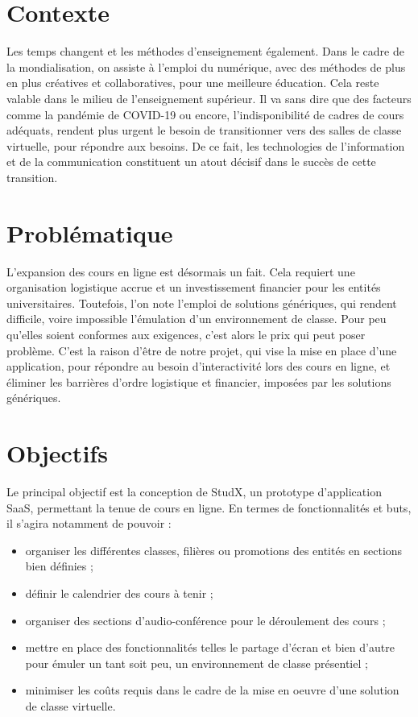 
\introduction

\thispagestyle{plain} %

\section*{Contexte}
Les temps changent et les méthodes d’enseignement également. 
Dans le cadre de la mondialisation, on assiste à l'emploi du numérique, 
avec des méthodes de plus en plus créatives et collaboratives, 
pour une meilleure éducation. Cela reste valable dans le milieu de l’enseignement supérieur.
Il va sans dire que des facteurs comme la pandémie de COVID-19 ou encore, 
l'indisponibilité de cadres de cours adéquats, 
rendent plus urgent le besoin de transitionner 
vers des salles de classe virtuelle, pour répondre aux besoins. 
De ce fait, les technologies de l’information et 
de la communication constituent un atout décisif dans le succès de cette transition.

\section*{Problématique}
L’expansion des cours en ligne est désormais un fait. 
Cela requiert une organisation logistique accrue et un investissement financier pour les entités universitaires. 
Toutefois, l’on note l’emploi de solutions génériques, qui rendent difficile, 
voire impossible l'émulation d’un environnement de classe. 
Pour peu qu’elles soient conformes aux exigences, c’est alors le prix qui peut poser problème. 
C’est la raison d'être de notre projet, qui vise la mise en place d’une application, 
pour répondre au besoin d'interactivité lors des cours en ligne, 
et éliminer les barrières d’ordre logistique et financier, imposées par les solutions génériques.

\section*{Objectifs}
Le principal objectif est la conception de StudX, un prototype d’application SaaS, permettant la tenue de cours en ligne.
En termes de fonctionnalités et buts, il s’agira notamment de pouvoir :
\begin{itemize}
  \item organiser les différentes classes, filières ou promotions des entités en sections bien définies ;
  \item définir le calendrier des cours à tenir ;
  \item organiser des sections d’audio-conférence pour le déroulement des cours ;
  \item mettre en place des fonctionnalités telles le partage d'écran et bien d’autre pour émuler un tant soit peu, 
    un environnement de classe présentiel ;
  \item minimiser les coûts requis dans le cadre de la mise en oeuvre d’une solution de classe virtuelle.
\end{itemize}

